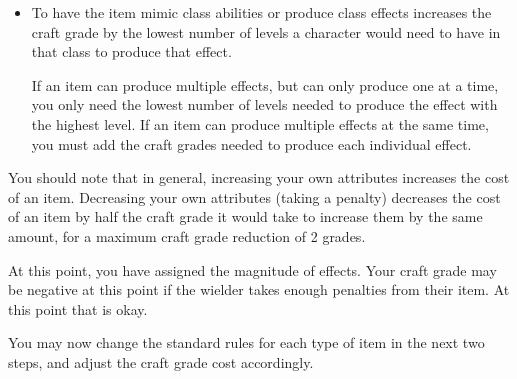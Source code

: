 \begin{description}
\begin{itemize}
		\item To have the item mimic class abilities or produce class effects increases the craft grade by the lowest number of levels a character would need to have in that class to produce that effect.
	
		If an item can produce multiple effects, but can only produce one at a time, you only need the lowest number of levels needed to produce the effect with the highest level. If an item can produce multiple effects at the same time, you must add the craft grades needed to produce each individual effect.
	\end{itemize}
\end{description}

You should note that in general, increasing your own attributes increases the cost of an item. Decreasing your own attributes (taking a penalty) decreases the cost of an item by half the craft grade it would take to increase them by the same amount, for a maximum craft grade reduction of 2 grades.

At this point, you have assigned the magnitude of effects. Your craft grade may be negative at this point if the wielder takes enough penalties from their item. At this point that is okay.

You may now change the standard rules for each type of item in the next two steps, and adjust the craft grade cost accordingly.

